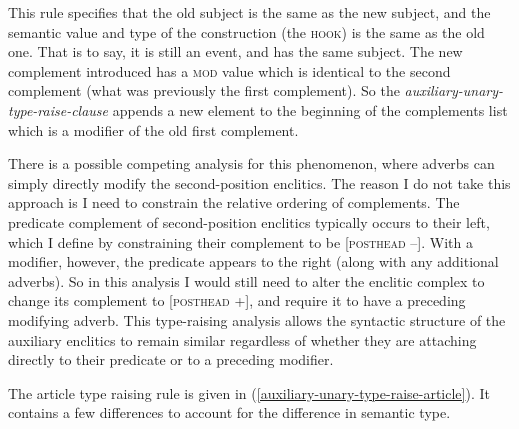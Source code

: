 \begin{singlespacing}
\ex \label{auxiliary-unary-type-raise-clause}
\xe
\end{singlespacing}

This rule specifies that the old subject is the same as the new subject, and the semantic value and type of the construction (the \textsc{hook}) is the same as the old one. That is to say, it is still an event, and has the same subject. The new complement introduced has a \textsc{mod} value which is identical to the second complement (what was previously the first complement). So the {\textit{auxiliary-unary-type-raise-clause}} appends a new element to the beginning of the complements list which is a modifier of the old first complement.

There is a possible competing analysis for this phenomenon, where adverbs can simply directly modify the second-position enclitics. The reason I do not take this approach is I need to constrain the relative ordering of complements. The predicate complement of second-position enclitics typically occurs to their left, which I define by constraining their complement to be [\textsc{posthead} --]. With a modifier, however, the predicate appears to the right (along with any additional adverbs). So in this analysis I would still need to alter the enclitic complex to change its complement to [\textsc{posthead} +], and require it to have a preceding modifying adverb. This type-raising analysis allows the syntactic structure of the auxiliary enclitics to remain similar regardless of whether they are attaching directly to their predicate or to a preceding modifier.

The article type raising rule is given in (\ref{auxiliary-unary-type-raise-article}). It contains a few differences to account for the difference in semantic type.


